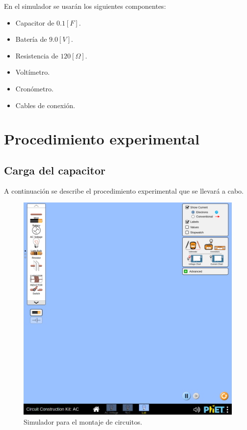 \documentclass[letter,11pt]{article}
\begin{document}
En el simulador se usarán los siguientes componentes:

\begin{itemize}
    \item Capacitor de $0.1 [F]$.
    \item Batería de $9.0 [V]$.
    \item Resistencia de $120 [\Omega]$.
    \item Voltímetro.
    \item Cronómetro.
    \item Cables de conexión.
\end{itemize}

\section{Procedimiento experimental}

\subsection{Carga del capacitor}
A continuación se describe el procedimiento experimental que se llevará a cabo.

\begin{figure}[!h]
\centering
\includegraphics[scale=0.40]{resources/figura2.eps}
\caption{Simulador para el montaje de circuitos.}
\label{figura2}
\end{figure}
\end{document}
